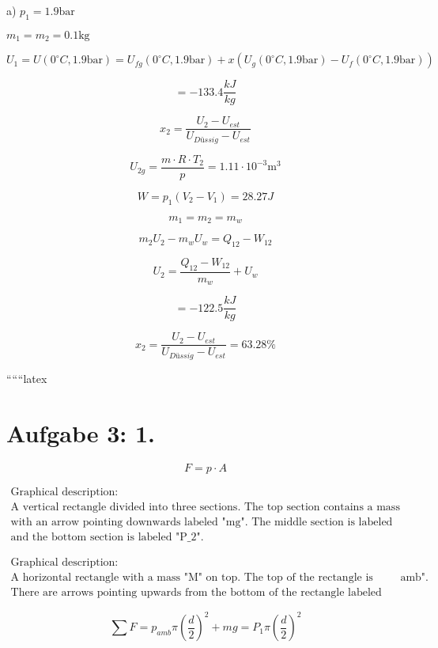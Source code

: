 a) $p_1 = 1.9 \text{bar}$

$m_1 = m_2 = 0.1 \text{kg}$

\[
U_1 = U(0^\circ C, 1.9 \text{bar}) = U_{fg}(0^\circ C, 1.9 \text{bar}) + x(U_g(0^\circ C, 1.9 \text{bar}) - U_f(0^\circ C, 1.9 \text{bar}))
\]

\[
= -133.4 \frac{kJ}{kg}
\]

\[
x_2 = \frac{U_2 - U_{est}}{U_{Düssig} - U_{est}}
\]

\[
U_{2g} = \frac{m \cdot R \cdot T_2}{p} = 1.11 \cdot 10^{-3} \text{m}^3
\]

\[
W = p_1 (V_2 - V_1) = 28.27J
\]

\[
m_1 = m_2 = m_w
\]

\[
m_2 U_2 - m_w U_w = Q_{12} - W_{12}
\]

\[
U_2 = \frac{Q_{12} - W_{12}}{m_w} + U_w
\]

\[
= -122.5 \frac{kJ}{kg}
\]

\[
x_2 = \frac{U_2 - U_{est}}{U_{Düssig} - U_{est}} = 63.28\%
\]

``````latex


\section*{Aufgabe 3: 1.}

\begin{equation*}
    F = p \cdot A
\end{equation*}

\[
\begin{array}{c}
\text{Graphical description:} \\
\text{A vertical rectangle divided into three sections. The top section contains a mass labeled "M"} \\
\text{with an arrow pointing downwards labeled "mg". The middle section is labeled "E w P_1"} \\
\text{and the bottom section is labeled "P_2".}
\end{array}
\]

\[
\begin{array}{c}
\text{Graphical description:} \\
\text{A horizontal rectangle with a mass "M" on top. The top of the rectangle is labeled "p_{amb}".} \\
\text{There are arrows pointing upwards from the bottom of the rectangle labeled "P_1".}
\end{array}
\]

\begin{equation*}
    \sum F = p_{amb} \pi \left( \frac{d}{2} \right)^2 + mg = P_1 \pi \left( \frac{d}{2} \right)^2
\end{equation*}

